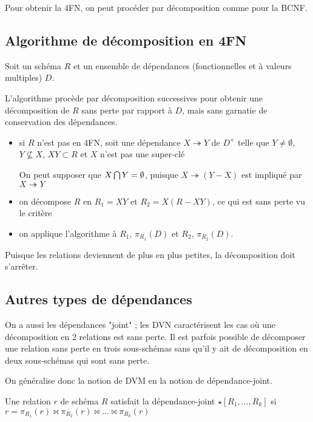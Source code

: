 		 Pour obtenir la 4FN, on peut procéder par décomposition comme pour la BCNF.
		 
		 \subsection{Algorithme de décomposition en 4FN}
		 
		 Soit un schéma $R$ et un ensemble de dépendances (fonctionnelles et à valeurs multiples) $D$.
		 
		 L'algorithme procède par décomposition successives pour obtenir une décomposition de $R$ sans perte par rapport à $D$, mais sans garnatie de conservation des dépendances.
		 
		 \begin{itemize}
		 	\item si $R$ n'est pas en 4FN, soit une dépendance $X \twoheadrightarrow Y$ de $D^+$ telle que $Y \neq \emptyset$, $Y \nsubseteq X$, $XY \subset R$ et $X$ n'est pas une super-clé
		 	
		 	On peut supposer que $X \bigcap Y = \emptyset$, puisque $X \twoheadrightarrow (Y - X)$ est impliqué par $X \twoheadrightarrow Y$
		 	\item on décompose $R$ en $R_1 = XY$ et $R_2 = X(R-  XY)$, ce qui est sans perte vu le critère
		 	\item on applique l'algorithme à $R_1$, $\pi_{R_1}(D)$ et $R_2$, $\pi_{R_2}(D)$.
		 \end{itemize}
		 
		 Puisque les relations deviennent de plus en plus petites, la décomposition doit s'arrêter.
		 
		 
		 
		 \subsection{Autres types de dépendances}
		 
		 On a aussi les dépendances "joint" ; les DVN caractérisent les cas où une décomposition en 2 relations est sans perte. Il est parfois possible de décomposer une relation sans perte en trois sous-schémas sans qu'il y ait de décomposition en deux sous-schémas qui sont sans perte.
		 
		 On généralise donc la notion de DVM en la notion de dépendance-joint.
		 
		 Une relation $r$ de schéma $R$ satisfait la dépendance-joint $\star [R_1, \dots , R_k]$ si $r = \pi_{R_1}(r) \Join \pi_{R_2} (r) \Join \dots \Join \pi_{R_k}(r)$
		 
